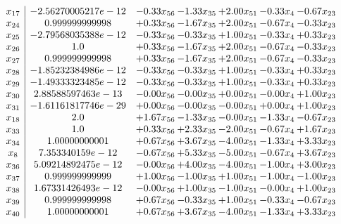 \documentclass[8pt]{article}
\begin{document}
\[\begin{array}{c| c c@{\hskip 2pt} c@{\hskip 2pt} c@{\hskip 2pt} c@{\hskip 2pt} c@{\hskip 2pt} }
 x_{17}   &  -2.56270005217e-12 & -0.33 x_{56} & -1.33 x_{35} & +  2.00 x_{51} & -0.33 x_{4} & -0.67 x_{23}\\
 x_{24}   &  0.999999999998 & +  0.33 x_{56} & -1.67 x_{35} & +  2.00 x_{51} & -0.67 x_{4} & -0.33 x_{23}\\
 x_{25}   &  -2.79568035388e-12 & -0.33 x_{56} & -0.33 x_{35} & +  1.00 x_{51} & -0.33 x_{4} & +  0.33 x_{23}\\
 x_{26}   &  1.0 & +  0.33 x_{56} & -1.67 x_{35} & +  2.00 x_{51} & -0.67 x_{4} & -0.33 x_{23}\\
 x_{27}   &  0.999999999998 & +  0.33 x_{56} & -1.67 x_{35} & +  2.00 x_{51} & -0.67 x_{4} & -0.33 x_{23}\\
 x_{28}   &  -1.85232384986e-12 & -0.33 x_{56} & -0.33 x_{35} & +  1.00 x_{51} & -0.33 x_{4} & +  0.33 x_{23}\\
 x_{29}   &  -1.49333323485e-12 & -0.33 x_{56} & -0.33 x_{35} & +  1.00 x_{51} & -0.33 x_{4} & +  0.33 x_{23}\\
 x_{30}   &  2.88588597463e-13 & -0.00 x_{56} & -0.00 x_{35} & +  0.00 x_{51} & -0.00 x_{4} & +  1.00 x_{23}\\
 x_{31}   &  -1.61161817746e-29 & +  0.00 x_{56} & -0.00 x_{35} & -0.00 x_{51} & +  0.00 x_{4} & +  1.00 x_{23}\\
 x_{18}   &  2.0 & +  1.67 x_{56} & -1.33 x_{35} & -0.00 x_{51} & -1.33 x_{4} & -0.67 x_{23}\\
 x_{33}   &  1.0 & +  0.33 x_{56} & +  2.33 x_{35} & -2.00 x_{51} & -0.67 x_{4} & +  1.67 x_{23}\\
 x_{34}   &  1.00000000001 & +  0.67 x_{56} & +  3.67 x_{35} & -4.00 x_{51} & -1.33 x_{4} & +  3.33 x_{23}\\
 x_{8}   &  7.353340159e-12 & -0.67 x_{56} & +  5.33 x_{35} & -5.00 x_{51} & -0.67 x_{4} & +  3.67 x_{23}\\
 x_{36}   &  5.09214892475e-12 & -0.00 x_{56} & +  4.00 x_{35} & -4.00 x_{51} & -1.00 x_{4} & +  3.00 x_{23}\\
 x_{37}   &  0.999999999999 & +  1.00 x_{56} & -1.00 x_{35} & +  1.00 x_{51} & -1.00 x_{4} & -1.00 x_{23}\\
 x_{38}   &  1.67331426493e-12 & -0.00 x_{56} & +  1.00 x_{35} & -1.00 x_{51} & -0.00 x_{4} & +  1.00 x_{23}\\
 x_{39}   &  0.999999999998 & +  0.67 x_{56} & -0.33 x_{35} & +  1.00 x_{51} & -0.33 x_{4} & -0.67 x_{23}\\
 x_{40}   &  1.00000000001 & +  0.67 x_{56} & +  3.67 x_{35} & -4.00 x_{51} & -1.33 x_{4} & +  3.33 x_{23}\\

\end{array}\]
\end{document}
